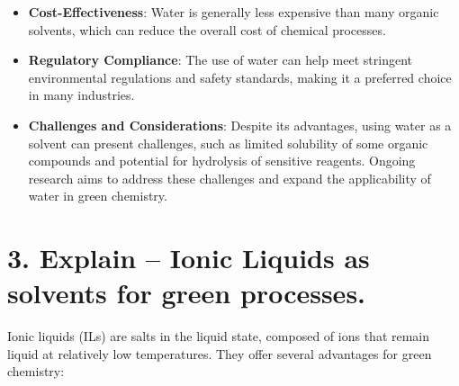 \documentclass[11pt]{article}
\begin{document}
\begin{itemize}
    \item \textbf{Cost-Effectiveness}: Water is generally less expensive than many organic solvents, which can reduce the overall cost of chemical processes.
    \item \textbf{Regulatory Compliance}: The use of water can help meet stringent environmental regulations and safety standards, making it a preferred choice in many industries.
    \item \textbf{Challenges and Considerations}: Despite its advantages, using water as a solvent can present challenges, such as limited solubility of some organic compounds and potential for hydrolysis of sensitive reagents. Ongoing research aims to address these challenges and expand the applicability of water in green chemistry.
\end{itemize}

\section{3. Explain – Ionic Liquids as solvents for green processes.}

Ionic liquids (ILs) are salts in the liquid state, composed of ions that remain liquid at relatively low temperatures. They offer several advantages for green chemistry:
\end{document}
